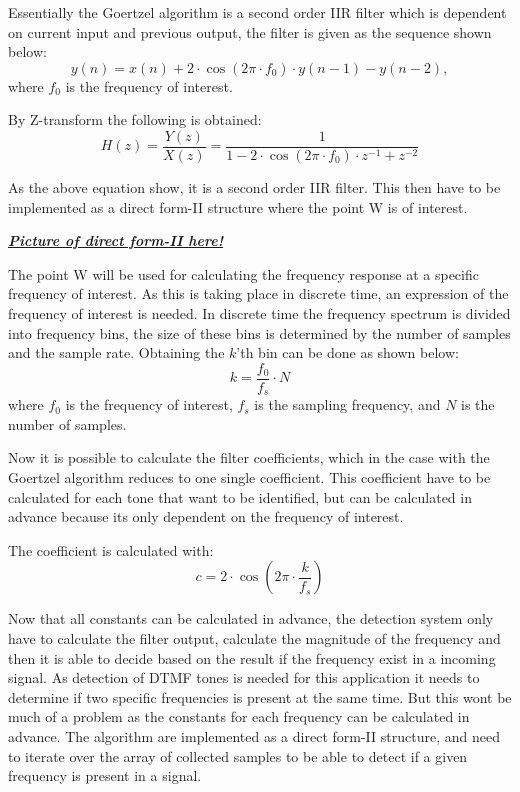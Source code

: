 		Essentially the Goertzel algorithm is a second order IIR filter which is dependent on current input and previous
		output, the filter is given as the sequence shown below:
		\begin{equation}y(n) = x(n) + 2\cdot \cos(2\pi \cdot f_{0})\cdot y(n - 1) - y(n - 2),\end{equation}
		where $f_{0}$ is the frequency of interest.
		
		By Z-transform the following is obtained:
		\begin{equation}H(z) = \frac{Y(z)}{X(z)} = \frac{1}{1 - 2\cdot \cos(2\pi \cdot f_{0})\cdot z^{-1} + z^{-2}}\end{equation}
		
		As the above equation show, it is a second order IIR filter. This then have to be implemented as a direct form-II structure
		where the point W is of interest.
		
		\textbf{\textit{\underline{Picture of direct form-II here!}}}
		
		The point W will be used for calculating the frequency response at a specific frequency of interest. As this is taking
		place in discrete time, an expression of the frequency of interest is needed. In discrete time the frequency spectrum
		is divided into frequency bins, the size of these bins is determined by the number of samples and the sample rate.
		Obtaining the $k$'th bin can be done as shown below:
		\begin{equation}k = \frac{f_{0}}{f_{s}}\cdot N\end{equation}
		where $f_{0}$ is the frequency of interest, $f_{s}$ is the sampling frequency, and $N$ is the number of samples.
		
		Now it is possible to calculate the filter coefficients, which in the case with the Goertzel algorithm reduces 
		to one single coefficient. This coefficient have to be calculated for each tone that want to be identified, but can 
		be calculated in advance because its only dependent on the frequency of interest.
		
		The coefficient is calculated with:
		\begin{equation}c = 2\cdot \cos(2\pi \cdot \frac{k}{f_{s}})\end{equation}
		
		Now that all constants can be calculated in advance, the detection system only have to calculate the filter output, calculate
		the magnitude of the frequency and then it is able to decide based on the result if the frequency exist in a incoming signal.
		As detection of DTMF tones is needed for this application it needs to determine if two specific frequencies is present at the
		same time. But this wont be much of a problem as the constants for each frequency can be calculated in advance.
		The algorithm are implemented as a direct form-II structure, and need to iterate over the array of collected samples to be
		able to detect if a given frequency is present in a signal.
		
